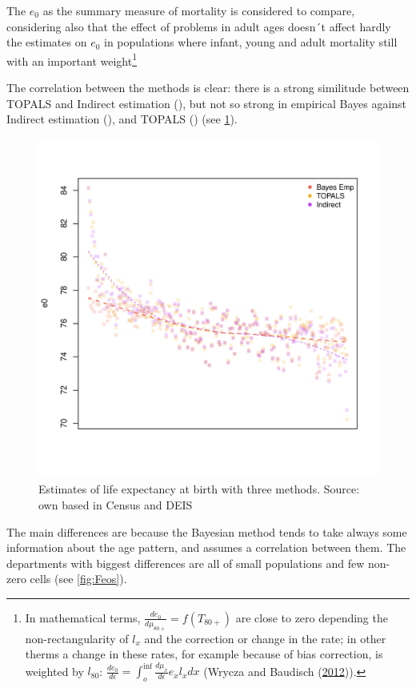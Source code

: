 \documentclass[12pt,]{article}
\begin{document}
The \(e_0\) as the summary measure of mortality is considered to
compare, considering also that the effect of problems in adult ages
doesn´t affect hardly the estimates on \(e_0\) in populations where
infant, young and adult mortality still with an important
weight\footnote{In mathematical terms,
  \(\frac{de_0}{d\mu_{80+}}=f(T_{80+})\) are close to zero depending the
  non-rectangularity of \(l_x\) and the correction or change in the
  rate; in other therms a change in these rates, for example because of
  bias correction, is weighted by \(l_80\):
  \(\frac{de_0}{d\epsilon}=\int_{o}^{\inf}{\frac{d\mu_x}{d\epsilon}e_x l_x dx}\)
  (Wrycza and Baudisch (\protect\hyperlink{ref-Wrycza2012}{2012})).}

The correlation between the methods is clear: there is a strong
similitude between TOPALS and Indirect estimation (), but not so strong
in empirical Bayes against Indirect estimation (), and TOPALS () (see
\ref{fig:comparativeMeth}).

\begin{figure}

{\centering \includegraphics[width=0.7\linewidth]{plots/CompMethods} 

}

\caption{Estimates of life expectancy at birth with three methods. Source: own based in Census and DEIS}\label{fig:comparativeMeth}
\end{figure}

The main differences are because the Bayesian method tends to take
always some information about the age pattern, and assumes a correlation
between them. The departments with biggest differences are all of small
populations and few non-zero cells (see \ref{fig:Feos}).
\end{document}
